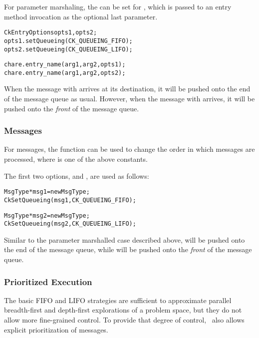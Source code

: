 For parameter marshaling, the  can be set for
, which is passed to an entry method invocation as the
optional last parameter.

\begin{alltt}
  CkEntryOptions opts1, opts2;
  opts1.setQueueing(CK_QUEUEING_FIFO);
  opts2.setQueueing(CK_QUEUEING_LIFO);

  chare.entry_name(arg1, arg2, opts1);
  chare.entry_name(arg1, arg2, opts2);
\end{alltt}

When the message with  arrives at its destination, it will be pushed onto the
end of the message queue as usual.  However, when the message with  arrives, it will be
pushed onto the \emph{front} of the message queue.

\subsubsection{Messages}

For messages, the  function can be used to change the order
in which messages are processed, where  is one of the above
constants.\\


\noindent The first two options,   and
, are used as follows:
%
\begin{alltt}
  MsgType *msg1 = new MsgType ;
  CkSetQueueing(msg1, CK_QUEUEING_FIFO);

  MsgType *msg2 = new MsgType ;
  CkSetQueueing(msg2, CK_QUEUEING_LIFO);
\end{alltt}

Similar to the parameter marshalled case described above, 
will be pushed onto the end of the message queue, while  will
be pushed onto the \emph{front} of the message queue.

\subsubsection{Prioritized Execution}
\label{prioritized message passing}

The basic FIFO and LIFO strategies are sufficient to approximate parallel
breadth-first and depth-first explorations of a problem space, but they do not
allow more fine-grained control. To provide that degree of control, \charmpp\
also allows explicit prioritization of messages.

